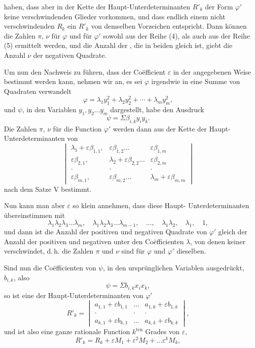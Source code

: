 haben, dass aber in der Kette der Haupt-Unterdeterminanten
$R'_k$ der Form $\varphi'$ keine verschwindenden Glieder vorkommen, und
dass endlich einem nicht verschwindenden $R_k$ ein $R'_k$ von dem\-selben
Vorzeichen entspricht. Dann können die Zahlen $\pi$, $\nu$ für
$\varphi$ und für $\varphi'$ sowohl aus der Reihe (4), als auch aus der Reihe
(5) ermittelt werden, und die Anzahl der , die
in beiden gleich ist, giebt die Anzahl $\nu$ der negativen Quadrate.

Um nun den Nachweis zu führen, dass der Coëfficient $\varepsilon$ in
der angegebenen Weise bestimmt werden kann, nehmen wir an,
es sei $\varphi$ irgendwie in eine Summe von Quadraten verwandelt
\[
\varphi = \lambda_1 y_1^2 + \lambda_2 y_2^2 + \cdots + \lambda_m y_m^2,
\]
und $\psi$, in den Variablen $y_1, y_2 \ldots y_m$ dargestellt, habe den
Ausdruck
\[
\psi = \Sigma \beta_{i,k} y_i y_k.
\]
Die Zahlen $\pi$, $\nu$ für die Function $\varphi'$ werden dann aus der
Kette der Haupt-Unterdeterminanten von
\[
\begin{vmatrix}
\lambda_1 + \varepsilon\beta_{1,1}, & \varepsilon\beta_{1,2} \ldots & \varepsilon\beta_{1,m} \\
\varepsilon\beta_{2,1}, & \lambda_2 + \varepsilon\beta_{2,2} \ldots & \varepsilon\beta_{2,m} \\
\cdot & \cdot & \cdot \\
\varepsilon\beta_{m,1}, & \varepsilon\beta_{m,2} \ldots & \lambda_m + \varepsilon\beta_{m,m}
\end{vmatrix}
\]
nach dem Satze V bestimmt.

Nun kann man aber $\varepsilon$ so klein annehmen, dass diese Haupt-
Unterdeterminanten  übereinstimmen mit
\[
\lambda_1\lambda_2\lambda_3 \ldots \lambda_m, \quad \lambda_1\lambda_2\lambda_3 \ldots \lambda_{m-1}, \quad \ldots, \quad \lambda_1\lambda_2, \quad \lambda_1, \quad 1,
\]
und dann ist die Anzahl der positiven und negativen Quadrate
von $\varphi'$ gleich der Anzahl der positiven und negativen unter den
Coëfficienten $\lambda$, von denen keiner verschwindet, d.\,h. die Zahlen
$\pi$ und $\nu$ sind für $\varphi$ und $\varphi'$ dieselben.

Sind nun die Coëfficienten von $\psi$, in den ursprünglichen
Variablen ausgedrückt, $b_{i,k}$, also
\[
\psi = \Sigma b_{i,k} x_i x_k,
\]
so ist eine der Haupt-Unterdeterminanten von $\varphi'$
\[
R'_k = \begin{vmatrix}
a_{1,1} + \varepsilon b_{1,1} & \ldots & a_{1,k} + \varepsilon b_{1,k} \\
\cdot & \cdot & \cdot \\
a_{k,1} + \varepsilon b_{k,1} & \ldots & a_{k,k} + \varepsilon b_{k,k}
\end{vmatrix},
\]
und ist also eine ganze rationale Function $k^{\mathrm{ten}}$ Grades von $\varepsilon$,
\[
R'_k = R_k + \varepsilon M_1 + \varepsilon^2 M_2 + \ldots \varepsilon^k M_k,
\]
